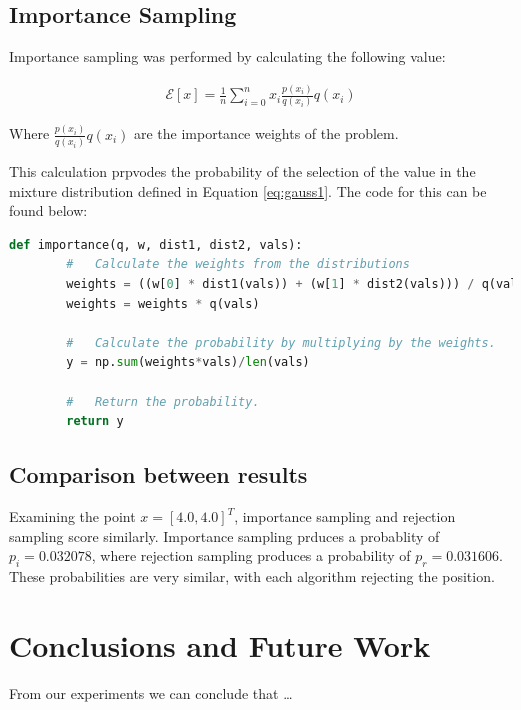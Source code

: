 \documentclass[a4paper, 11pt]{article}
\begin{document}
\subsection*{Importance Sampling}

Importance sampling was performed by calculating the following value:

\begin{equation}\label{eq:importance}
    \begin{align*}
        \mathcal{E}[x] = \frac{1}{n} \sum_{i=0}^n x_i \frac{p(x_i)}{q(x_i)} q(x_i)
    \end{align*}
\end{equation}

Where $\frac{p(x_i)}{q(x_i)} q(x_i)$ are the importance weights of the problem. 

This calculation prpvodes the probability of the selection of the value in the mixture distribution defined in Equation \ref*{eq:gauss1}. The code for this can be found below:
\begin{lstlisting}[language=Python, caption=Python example]
    def importance(q, w, dist1, dist2, vals):
        #   Calculate the weights from the distributions
        weights = ((w[0] * dist1(vals)) + (w[1] * dist2(vals))) / q(vals) #np.sum(((w[0] * dist1(samples)) + (w[1] * dist2(samples))))
        weights = weights * q(vals)

        #   Calculate the probability by multiplying by the weights.
        y = np.sum(weights*vals)/len(vals)

        #   Return the probability.
        return y
\end{lstlisting}

\subsection*{Comparison between results}

Examining the point $x = [4.0, 4.0]^T$, importance sampling and rejection sampling score similarly. Importance sampling prduces a probablity of $p_i = 0.032078$, where rejection sampling produces a probability of $p_r = 0.031606$. These probabilities are very similar, with each algorithm rejecting the position. 
\pagebreak

\section{Conclusions and Future Work}

From our experiments we can conclude that \ldots


\end{document}
